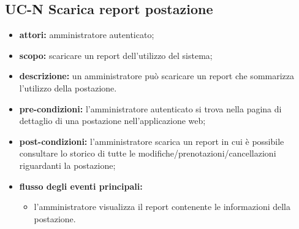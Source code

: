 \subsection{UC-N Scarica report postazione}
\begin{itemize}
    \item \textbf{attori:} amministratore autenticato;
    \item \textbf{scopo:} scaricare un report dell'utilizzo del sistema;
    \item \textbf{descrizione:} un amministratore pu\`{o} scaricare un report che sommarizza l'utilizzo della postazione.
    \item \textbf{pre-condizioni:} l'amministratore autenticato si trova nella pagina di dettaglio di una postazione nell'applicazione web;
    \item \textbf{post-condizioni:} l'amministratore scarica un report in cui \`{e} possibile consultare lo storico di tutte le modifiche/prenotazioni/cancellazioni riguardanti la postazione;
    \item \textbf{flusso degli eventi principali:}
    \begin{itemize}
        \item l'amministratore visualizza il report contenente le informazioni della postazione.
    \end{itemize}
\end{itemize}